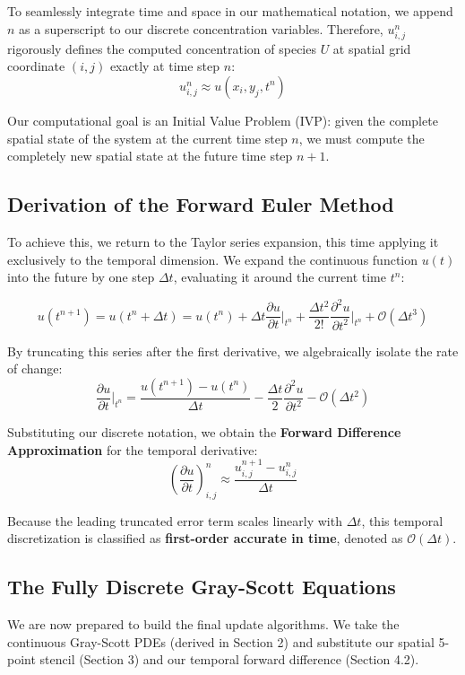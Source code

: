 \documentclass[12pt,a4paper]{article}
\begin{document}
To seamlessly integrate time and space in our mathematical notation, we append $n$ as a superscript to our discrete concentration variables. Therefore, $u^n_{i,j}$ rigorously defines the computed concentration of species $U$ at spatial grid coordinate $(i, j)$ exactly at time step $n$:
$$u^n_{i,j} \approx u(x_i, y_j, t^n)$$

Our computational goal is an Initial Value Problem (IVP): given the complete spatial state of the system at the current time step $n$, we must compute the completely new spatial state at the future time step $n+1$.

\subsection{Derivation of the Forward Euler Method}
To achieve this, we return to the Taylor series expansion, this time applying it exclusively to the temporal dimension. We expand the continuous function $u(t)$ into the future by one step $\Delta t$, evaluating it around the current time $t^n$:

$$u(t^{n+1}) = u(t^n + \Delta t) = u(t^n) + \Delta t \frac{\partial u}{\partial t}\bigg|_{t^n} + \frac{\Delta t^2}{2!} \frac{\partial^2 u}{\partial t^2}\bigg|_{t^n} + \mathcal{O}(\Delta t^3)$$

By truncating this series after the first derivative, we algebraically isolate the rate of change:
$$\frac{\partial u}{\partial t}\bigg|_{t^n} = \frac{u(t^{n+1}) - u(t^n)}{\Delta t} - \frac{\Delta t}{2} \frac{\partial^2 u}{\partial t^2} - \mathcal{O}(\Delta t^2)$$

Substituting our discrete notation, we obtain the \textbf{Forward Difference Approximation} for the temporal derivative:
$$\left( \frac{\partial u}{\partial t} \right)^n_{i,j} \approx \frac{u^{n+1}_{i,j} - u^n_{i,j}}{\Delta t}$$

Because the leading truncated error term scales linearly with $\Delta t$, this temporal discretization is classified as \textbf{first-order accurate in time}, denoted as $\mathcal{O}(\Delta t)$.

\subsection{The Fully Discrete Gray-Scott Equations}
We are now prepared to build the final update algorithms. We take the continuous Gray-Scott PDEs (derived in Section 2) and substitute our spatial 5-point stencil (Section 3) and our temporal forward difference (Section 4.2). 
\end{document}
